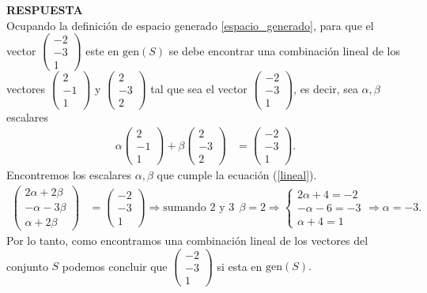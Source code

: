 \documentclass[11pt,letterpaper]{article}
\newcommand{\res}{\textbf{RESPUESTA}\\}
\newcommand{\gen}{\text{gen}}
\begin{document}
\begin{enumerate}
\res 
Ocupando la definición de espacio generado \ref{espacio_generado}, para que el vector $\begin{pmatrix}
-2\\
-3\\
1
\end{pmatrix}$
 este en $\gen (S)$ se debe encontrar una combinación lineal de los vectores 
$\begin{pmatrix}
2\\
-1\\
1
\end{pmatrix}$ y $\begin{pmatrix}
2\\
-3\\
2
\end{pmatrix}$ tal que sea el vector $\begin{pmatrix}
-2\\
-3\\
1
\end{pmatrix}$, es decir, sea $\alpha, \beta$ escalares 
\begin{align}\label{lineal}
\alpha \begin{pmatrix}
2\\
-1\\
1
\end{pmatrix}+\beta \begin{pmatrix}
2\\
-3\\
2
\end{pmatrix}&=\begin{pmatrix}
-2\\
-3\\
1
\end{pmatrix}.
\end{align}
Encontremos los escalares $\alpha, \beta$ que cumple la ecuación (\ref{lineal}).
\begin{align*}
\begin{pmatrix}
2\alpha+2\beta\\
-\alpha-3\beta\\
\alpha+2\beta
\end{pmatrix}&=\begin{pmatrix}
-2\\
-3\\
1
\end{pmatrix}\Rightarrow\text{sumando 2 y 3}\ \ 
\beta=2 \Rightarrow \left\{\begin{matrix}
2\alpha+4=-2\\
-\alpha-6=-3\\
\alpha+4=1
\end{matrix}\right.\Rightarrow\alpha=-3.
\end{align*}
Por lo tanto, como encontramos una combinación lineal de los vectores del conjunto $S$ podemos concluir que $\begin{pmatrix}
-2\\
-3\\
1
\end{pmatrix}$ si esta en $\gen (S).$\\


\end{enumerate}
\end{document}
